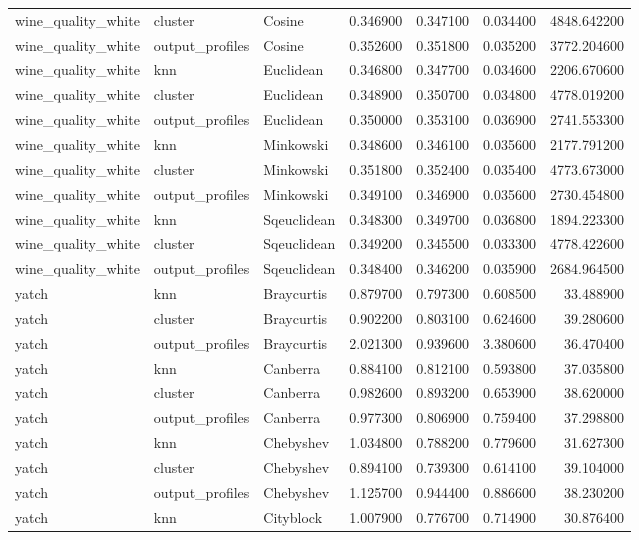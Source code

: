 \begin{tabular}{lllrrrr}
wine\_quality\_white & cluster & Cosine & 0.346900 & 0.347100 & 0.034400 & 4848.642200 \\
wine\_quality\_white & output\_profiles & Cosine & 0.352600 & 0.351800 & 0.035200 & 3772.204600 \\
wine\_quality\_white & knn & Euclidean & 0.346800 & 0.347700 & 0.034600 & 2206.670600 \\
wine\_quality\_white & cluster & Euclidean & 0.348900 & 0.350700 & 0.034800 & 4778.019200 \\
wine\_quality\_white & output\_profiles & Euclidean & 0.350000 & 0.353100 & 0.036900 & 2741.553300 \\
wine\_quality\_white & knn & Minkowski & 0.348600 & 0.346100 & 0.035600 & 2177.791200 \\
wine\_quality\_white & cluster & Minkowski & 0.351800 & 0.352400 & 0.035400 & 4773.673000 \\
wine\_quality\_white & output\_profiles & Minkowski & 0.349100 & 0.346900 & 0.035600 & 2730.454800 \\
wine\_quality\_white & knn & Sqeuclidean & 0.348300 & 0.349700 & 0.036800 & 1894.223300 \\
wine\_quality\_white & cluster & Sqeuclidean & 0.349200 & 0.345500 & 0.033300 & 4778.422600 \\
wine\_quality\_white & output\_profiles & Sqeuclidean & 0.348400 & 0.346200 & 0.035900 & 2684.964500 \\
yatch & knn & Braycurtis & 0.879700 & 0.797300 & 0.608500 & 33.488900 \\
yatch & cluster & Braycurtis & 0.902200 & 0.803100 & 0.624600 & 39.280600 \\
yatch & output\_profiles & Braycurtis & 2.021300 & 0.939600 & 3.380600 & 36.470400 \\
yatch & knn & Canberra & 0.884100 & 0.812100 & 0.593800 & 37.035800 \\
yatch & cluster & Canberra & 0.982600 & 0.893200 & 0.653900 & 38.620000 \\
yatch & output\_profiles & Canberra & 0.977300 & 0.806900 & 0.759400 & 37.298800 \\
yatch & knn & Chebyshev & 1.034800 & 0.788200 & 0.779600 & 31.627300 \\
yatch & cluster & Chebyshev & 0.894100 & 0.739300 & 0.614100 & 39.104000 \\
yatch & output\_profiles & Chebyshev & 1.125700 & 0.944400 & 0.886600 & 38.230200 \\
yatch & knn & Cityblock & 1.007900 & 0.776700 & 0.714900 & 30.876400 \\

\end{tabular}
